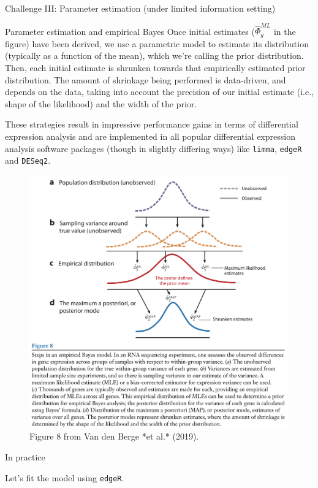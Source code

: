\documentclass[ignorenonframetext,]{beamer}
\begin{document}
\begin{frame}[fragile]{Challenge III: Parameter estimation (under
limited information setting)}
\begin{block}{Parameter estimation and empirical Bayes}
Once initial estimates (\(\hat{\Phi}_g^{ML}\) in the figure) have been
derived, we use a parametric model to estimate its distribution
(typically as a function of the mean), which we're calling the prior
distribution. Then, each initial estimate is shrunken towards that
empirically estimated prior distribution. The amount of shrinkage being
performed is data-driven, and depends on the data, taking into account
the precision of our initial estimate (i.e., shape of the likelihood)
and the width of the prior.

These strategies result in impressive performance gains in terms of
differential expression analysis and are implemented in all popular
differential expression analysis software packages (though in slightly
differing ways) like \texttt{limma}, \texttt{edgeR} and \texttt{DESeq2}.

\begin{figure}
\includegraphics[width=28.9in]{./images_sequencing/empiricalBayes} \caption{Figure 8 from Van den Berge *et al.* (2019).}\label{fig:unnamed-chunk-15}
\end{figure}

\end{block}

\begin{block}{In practice}

Let's fit the model using \texttt{edgeR}.


\end{block}
\end{frame}
\end{document}
